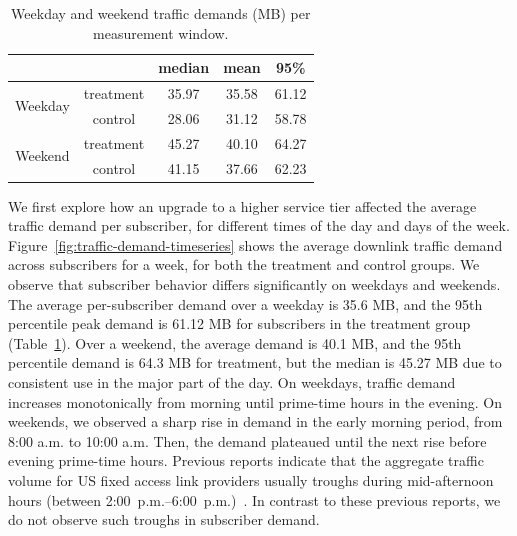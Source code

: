 \begin{table}[t]
\centering
\begin{tabular}{c c | c c c |}
\cline{3-5}
        &           & median & mean  & 95\%  \\ \hline
\multicolumn{1}{|c|}{\multirow{2}{*}{Weekday}} 	& treatment & 35.97  & 35.58 & 61.12 \\
\multicolumn{1}{|c|}{}					        & control   & 28.06  & 31.12 & 58.78 \\\hline
\multicolumn{1}{|c|}{\multirow{2}{*}{Weekend}}	& treatment & 45.27  & 40.10 & 64.27 \\
\multicolumn{1}{|c|}{} 					        & control   & 41.15  & 37.66 & 62.23 \\\hline
\end{tabular}
\caption{Weekday and weekend traffic demands (MB) per measurement window.}
\label{tab:traffic-demand-description}
\end{table}

We first explore how an upgrade to a higher service tier affected the
average traffic demand per subscriber, for different times of the day
and days of the week.  Figure~\ref{fig:traffic-demand-timeseries} shows
the average downlink traffic demand across subscribers for a week, for
both the treatment and control groups. We observe that subscriber
behavior differs significantly on weekdays and weekends.  The average
per-subscriber demand over a weekday is 35.6 MB, and the 95th percentile
peak demand is 61.12 MB for subscribers in the treatment group
(Table~\ref{tab:traffic-demand-description}).  Over a weekend, the
average demand is 40.1 MB, and the 95th percentile demand is 64.3 MB for
treatment, but the median is 45.27 MB due to consistent use in the major
part of the day.  On weekdays, traffic demand increases monotonically
from morning until prime-time hours in the evening. On weekends, we
observed a sharp rise in demand in the early morning period, from 8:00
a.m. to 10:00 a.m. Then, the demand plateaued until the next rise
before evening prime-time hours. Previous reports indicate that
the aggregate traffic volume for US fixed access link providers usually
troughs during mid-afternoon hours (between
2:00~p.m.--6:00~p.m.)~\cite{sandvine20141h}. In contrast to these
  previous reports, we do not observe such troughs in 
subscriber demand.


